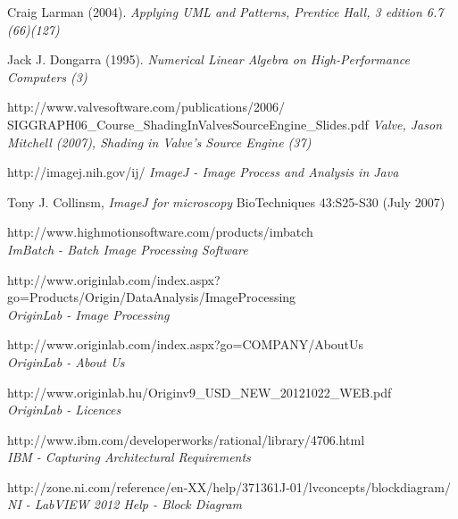 \documentclass[a4paper,12pt,oneside]{report}
\begin{document}
\begin{thebibliography}{99}

		Craig Larman (2004). 
        {\em Applying UML and Patterns, Prentice Hall, 3 edition 6.7 (66)(127)\\}

		Jack J. Dongarra (1995). 
        {\em Numerical Linear Algebra on High-Performance Computers (3)\\}
        
		http://www.valvesoftware.com/publications/2006/\\SIGGRAPH06\_Course\_ShadingInValvesSourceEngine\_Slides.pdf
        {\em Valve, Jason Mitchell (2007), Shading in Valve’s Source Engine  (37) \\}     
        
        

        http://imagej.nih.gov/ij/
        {\em ImageJ - Image Process and Analysis in Java}
        
		Tony J. Collinsm,
        {\em ImageJ for microscopy}
        BioTechniques 43:S25-S30 (July 2007)

        http://www.highmotionsoftware.com/products/imbatch\\
        {\em ImBatch - Batch Image Processing Software}

		http://www.originlab.com/index.aspx?go=Products/Origin/DataAnalysis/ImageProcessing\\
        {\em OriginLab - Image Processing}
        
        
        http://www.originlab.com/index.aspx?go=COMPANY/AboutUs\\
        {\em OriginLab - About Us}

		http://www.originlab.hu/Originv9\_USD\_NEW\_20121022\_WEB.pdf\\
        {\em OriginLab - Licences}
        
        http://www.ibm.com/developerworks/rational/library/4706.html\\
        {\em IBM - Capturing Architectural Requirements}  


		http://zone.ni.com/reference/en-XX/help/371361J-01/lvconcepts/blockdiagram/\\
        {\em NI - LabVIEW 2012 Help - Block Diagram}  


\end{thebibliography}
\end{document}
